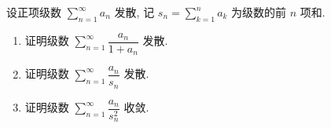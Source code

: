 \begin{question}[points = 10]
设正项级数 $\sum\limits_{n=1}^{\infty} a_n$ 发散, 记 $s_n = \sum\limits_{k=1}^n a_k$ 为级数的前 $n$ 项和.
\begin{enumerate}
\item 证明级数 $\sum\limits_{n=1}^{\infty} \dfrac{a_n}{1 + a_n}$ 发散.
\item 证明级数 $\sum\limits_{n=1}^{\infty} \dfrac{a_n}{s_n}$ 发散.
\item 证明级数 $\sum\limits_{n=1}^{\infty} \dfrac{a_n}{s_n^2}$ 收敛.
\end{enumerate}

\end{question}


